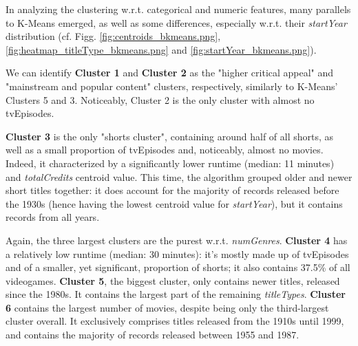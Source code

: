 In analyzing the clustering w.r.t. categorical and numeric features, many parallels to K-Means emerged, as well as some differences, especially w.r.t. their \textit{startYear} distribution (cf. Figg. \ref{fig:centroids_bkmeans.png}, \ref{fig:heatmap_titleType_bkmeans.png} and \ref{fig:startYear_bkmeans.png}).

We can identify \textbf{Cluster 1} and \textbf{Cluster 2} as the "higher critical appeal" and "mainstream and popular content" clusters, respectively, similarly to K-Means' Clusters 5 and 3. Noticeably, Cluster 2 is the only cluster with almost no tvEpisodes.

\textbf{Cluster 3} is the only "shorts cluster", containing around half of all shorts, as well as a small proportion of tvEpisodes and, noticeably, almost no movies. Indeed, it characterized by a significantly lower runtime (median: 11 minutes) and \textit{totalCredits} centroid value. This time, the algorithm grouped older and newer short titles together: it does account for the majority  of records released before the 1930s (hence having the lowest centroid value for \textit{startYear}), but it contains records from all years.

Again, the three largest clusters are the purest w.r.t. \textit{numGenres}.
\textbf{Cluster 4} has a relatively low runtime (median: 30 minutes): it's mostly made up of tvEpisodes and of a smaller, yet significant, proportion of shorts; it also contains 37.5\% of all videogames.
\textbf{Cluster 5}, the biggest cluster, only contains newer titles, released since the 1980s. It contains the largest part of the remaining \textit{titleTypes}.
\textbf{Cluster 6} contains the largest number of movies, despite being only the third-largest cluster overall. It exclusively comprises titles released from the 1910s until 1999, and contains the majority of records released between 1955 and 1987.

